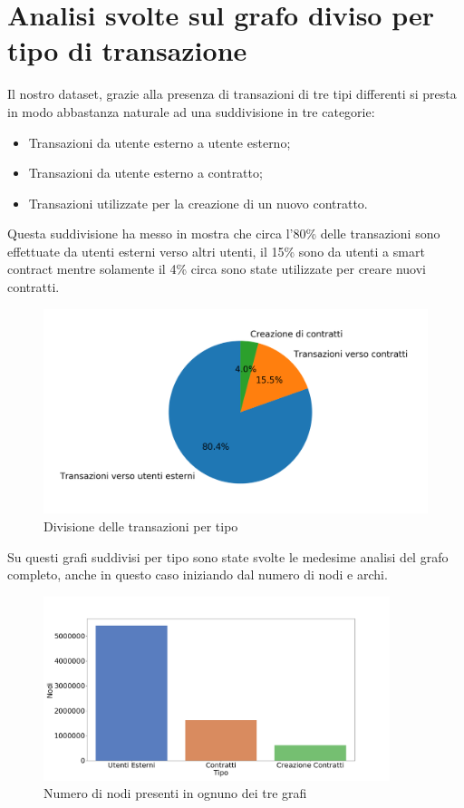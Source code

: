 \documentclass[12pt]{report}
\begin{document}
\newpage
\section{Analisi svolte sul grafo diviso per tipo di transazione}

Il nostro dataset, grazie alla presenza di transazioni di tre tipi differenti si presta in modo abbastanza naturale ad una suddivisione in tre categorie:

\begin{itemize}
    \item Transazioni da utente esterno a utente esterno;
    \item Transazioni da utente esterno a contratto;
    \item Transazioni utilizzate per la creazione di un nuovo contratto.
\end{itemize}

Questa suddivisione ha messo in mostra che circa l'80\% delle transazioni sono effettuate da utenti esterni verso altri utenti, il 15\% sono da utenti a smart contract mentre solamente il 4\% circa sono state utilizzate per creare nuovi contratti.

\begin{figure}[H]
    \centering\includegraphics[width=\textwidth]{Torta.png}
    \caption{Divisione delle transazioni per tipo}
\end{figure}

\newpage
Su questi grafi suddivisi per tipo sono state svolte le medesime analisi del grafo completo, anche in questo caso iniziando dal numero di nodi e archi.

\begin{figure}[H]
    \centering\includegraphics[width=0.9\textwidth]{NumeroNodiTipo.png}
    \caption{Numero di nodi presenti in ognuno dei tre grafi}
\end{figure}
\end{document}
